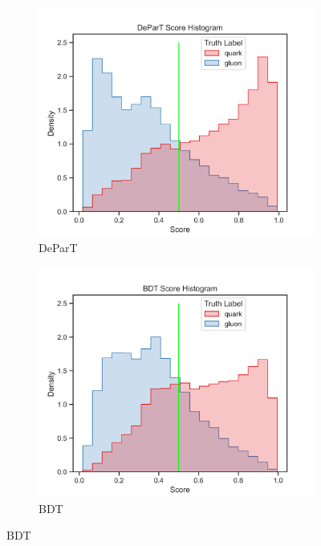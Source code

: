 
\begin{figure}[!htb]
	\centering
	\begin{subfigure}[t]{0.49\textwidth}
		\includegraphics[width=1\textwidth]{src/plots/results/score/depart.png}
		\caption{DeParT}
		\label{fig:app_score_depart}
	\end{subfigure}
	\begin{subfigure}[t]{0.49\textwidth}
		\includegraphics[width=1\textwidth]{src/plots/results/score/bdt.png}
		\caption{BDT}
		\label{fig:app_score_bdt}
	\end{subfigure}

\end{figure}
